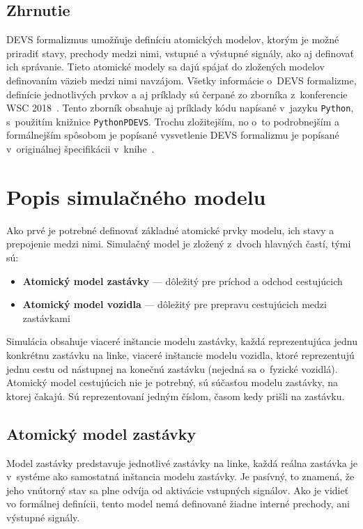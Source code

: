 \subsection*{Zhrnutie}
DEVS formalizmus umožňuje definíciu atomických modelov, ktorým je možné priradiť stavy, prechody medzi nimi, vstupné a výstupné signály, ako aj definovať ich správanie.
Tieto atomické modely sa dajú spájať do zložených modelov definovaním väzieb medzi nimi navzájom.
Všetky informácie o~DEVS formalizme, definície jednotlivých prvkov a aj príklady sú čerpané zo zborníka z~konferencie WSC 2018~\cite{tendeloo2018discrete}.
Tento zborník obsahuje aj príklady kódu napísané v~jazyku \texttt{Python}, s~použitím knižnice \texttt{PythonPDEVS}.
Trochu zložitejším, no o~to podrobnejším a formálnejším spôsobom je popísané vysvetlenie DEVS formalizmu je popísané v~originálnej špecifikácii v~knihe~\cite{zeigler2000theory}.

\section{Popis simulačného modelu}
Ako prvé je potrebné definovať základné atomické prvky modelu, ich stavy a prepojenie medzi nimi.
Simulačný model je zložený z~dvoch hlavných častí, tými sú:
\begin{itemize}
  \item \textbf{Atomický model zastávky} --- dôležitý pre príchod a odchod cestujúcich
  \item \textbf{Atomický model vozidla} --- dôležitý pre prepravu cestujúcich medzi zastávkami
\end{itemize}

Simulácia obsahuje viaceré inštancie modelu zastávky, každá reprezentujúca jednu konkrétnu zastávku na linke,
viaceré inštancie modelu vozidla, ktoré reprezentujú jednu cestu od nástupnej na konečnú zastávku (nejedná sa o~fyzické vozidlá).
Atomický model cestujúcich nie je potrebný, sú súčasťou modelu zastávky, na ktorej čakajú.
Sú reprezentovaní jedným číslom, časom kedy prišli na zastávku.

\newpage
\subsection*{Atomický model zastávky}\label{model_zastavky}

Model zastávky predstavuje jednotlivé zastávky na linke, každá reálna zastávka je v~systéme ako samostatná inštancia modelu zastávky.
Je pasívný, to znamená, že jeho vnútorný stav sa plne odvíja od aktivácie vstupných signálov.
Ako je vidieť vo formálnej definícii, tento model nemá definované žiadne interné prechody, ani výstupné signály.

